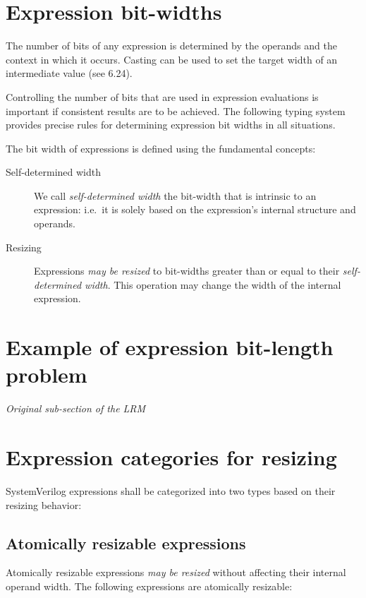 \documentclass{article}
\newcommand{\sds}{\emph{self-determined width}}
\newcommand{\mbr}{\emph{may be resized}}
\begin{document}
\section{Expression bit-widths}%
\label{expression-bit-widths}

The number of bits of any expression is determined by the operands and the
context in which it occurs. Casting can be used to set the target width of an
intermediate value (see 6.24).

Controlling the number of bits that are used in expression evaluations is
important if consistent results are to be achieved. The following typing system
provides precise rules for determining expression bit widths in all situations.

The bit width of expressions is defined using the fundamental concepts:

\begin{description}
  \item[Self-determined width]
    We call \sds{} the bit-width that is intrinsic to an expression: i.e.~it is
    solely based on the expression's internal structure and operands.

  \item[Resizing]
    Expressions \mbr{} to bit-widths greater than or equal to their \sds{}. This
    operation may change the width of the internal expression.
\end{description}

\section{Example of expression bit-length problem}%

\emph{Original sub-section of the LRM}
\textelp{}

\section{Expression categories for resizing}%

SystemVerilog expressions shall be categorized into two types based on their
resizing behavior:

\subsection{Atomically resizable expressions}%

Atomically resizable expressions \mbr{} without affecting their
internal operand width. The following expressions are atomically resizable:
\end{document}
